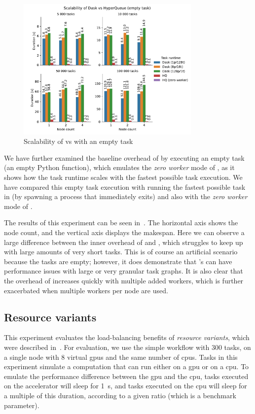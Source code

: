 \begin{figure}[h]
	\centering
	\includegraphics[width=0.8\textwidth]{imgs/hq/charts/dask-vs-hq-empty}
	\caption{Scalability of \hyperqueue{} vs \dask{} with an empty task}
	\label{fig:hq-dask-empty}
\end{figure}

We have further examined the baseline overhead of \dask{} by executing an empty
task (an empty Python function), which emulates the \emph{zero worker} mode of
\hyperqueue{}, as it shows how the task runtime scales with the fastest possible task
execution. We have compared this empty task execution with running the fastest possible task in
\hyperqueue{} (by spawning a process that immediately exits) and also with the \emph{zero worker} mode of \hyperqueue{}.

The results of this experiment can be seen in~. The horizontal axis shows
the node count, and the vertical axis displays the makespan. Here we can observe a large difference
between the inner overhead of \hyperqueue{} and \dask{}, which struggles
to keep up with large amounts of very short tasks. This is of course an artificial scenario because
the tasks are empty; however, it does demonstrate that \dask{}'s can have
performance issues with large or very granular task graphs. It is also clear that the overhead of
\dask{} increases quickly with multiple added workers, which is further exacerbated
when multiple workers per node are used.

\subsection{Resource variants}
\label{sec:hq-exp-resource-variants}
This experiment evaluates the load-balancing benefits of \emph{resource variants}, which were
described in~. For evaluation, we use the simple workflow with
$300$ tasks, on a single node with $8$ virtual
\glspl{gpu} and the same number of \glspl{cpu}. Tasks in this experiment
simulate a computation that can run either on a \gls{gpu} or on a
\gls{cpu}. To emulate the performance difference between the \gls{gpu}
and the \gls{cpu}, tasks executed on the accelerator will sleep for
\SI{1}{\second}, and tasks executed on the \gls{cpu} will sleep for a
multiple of this duration, according to a given ratio (which is a benchmark parameter).

